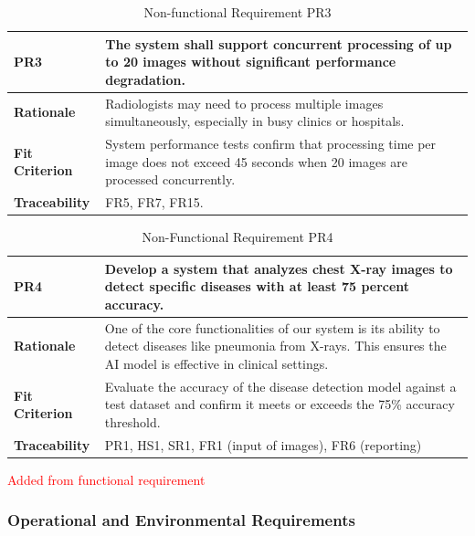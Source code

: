 \documentclass[12pt]{article}
\begin{document}
\begin{table}[h!]
\centering
{}
\begin{tabular}{|p{3.5cm}|p{11.5cm}|}
\hline
\rowcolor{gray!30}
\textbf{PR3} & The system shall support concurrent processing of up to 20 images without significant performance degradation. \\
\hline
\textbf{Rationale} & Radiologists may need to process multiple images simultaneously, especially in busy clinics or hospitals. \\
\hline
\textbf{Fit Criterion} & System performance tests confirm that processing time per image does not exceed 45 seconds when 20 images are processed concurrently. \\
\hline
\textbf{Traceability} & FR5, FR7, FR15. \\
\hline
\end{tabular}
\caption{Non-functional Requirement PR3}
\end{table}

\begin{table}[h!]
\centering
{}
\begin{tabular}{|p{3.5cm}|p{11.5cm}|}
\hline
\rowcolor{gray!30}
\textbf{PR4} & Develop a system that analyzes chest X-ray images to detect specific diseases with at least 75 percent accuracy. \\
\hline
\textbf{Rationale} & One of the core functionalities of our system is its ability to detect diseases like pneumonia from X-rays. This ensures the AI model is effective in clinical settings. \\
\hline
\textbf{Fit Criterion} & Evaluate the accuracy of the disease detection model against a test dataset and confirm it meets or exceeds the 75\% accuracy threshold. \\

\hline
\textbf{Traceability} & PR1, HS1, SR1, FR1 (input of images), FR6 (reporting) \\
\hline
\end{tabular}
\caption{Non-Functional Requirement PR4}
\textcolor{red}{Added from functional requirement}
\end{table} 

\newpage
\subsubsection{Operational and Environmental Requirements}
\end{document}
